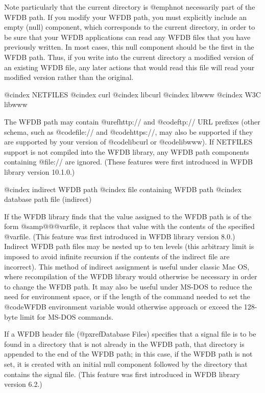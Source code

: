 {Note particularly that the current directory is @emph{not} necessarily
part of the WFDB path.  If you modify your WFDB path, you must
explicitly include an empty (null) component, which corresponds to the
current directory, in order to be sure that your WFDB applications can
read any WFDB files that you have previously written.  In most cases,
this null component should be the first in the WFDB path.  Thus, if you
write into the current directory a modified version of an existing WFDB
file, any later actions that would read this file will read your
modified version rather than the original.

@cindex NETFILES
@cindex curl
@cindex libcurl
@cindex libwww
@cindex W3C libwww

The WFDB path may contain @uref{http://} and @code{ftp://} URL prefixes (other
schema, such as @code{file://} and @code{https://}, may also be supported if
they are supported by your version of @code{libcurl} or @code{libwww}).  If
NETFILES support is not compiled into the WFDB library, any WFDB path
components containing @file{://} are ignored.  (These features were first
introduced in WFDB library version 10.1.0.)

@cindex indirect WFDB path
@cindex file containing WFDB path
@cindex database path file (indirect)

If the WFDB library finds that the value assigned to the WFDB path is of the
form @samp{@@@var{file}}, it replaces that value with the contents of
the specified @var{file}.  (This feature was first introduced in WFDB
library version 8.0.)  Indirect WFDB path files may be nested up to ten
levels (this arbitrary limit is imposed to avoid infinite recursion if
the contents of the indirect file are incorrect).  This method of
indirect assignment is useful under classic Mac OS, where recompilation of
the WFDB library would otherwise be necessary in order to change the WFDB
path.  It may also be useful under MS-DOS to reduce the need for
environment space, or if the length of the command needed to set the
@code{WFDB} environment variable would otherwise approach or exceed the
128-byte limit for MS-DOS commands.

If a WFDB header file (@pxref{Database Files}) specifies that a signal
file is to be found in a directory that is not already in the WFDB path,
that directory is appended to the end of the WFDB path; in this case, if
the WFDB path is not set, it is created with an initial null component
followed by the directory that contains the signal file.  (This feature
was first introduced in WFDB library version 6.2.)

}
